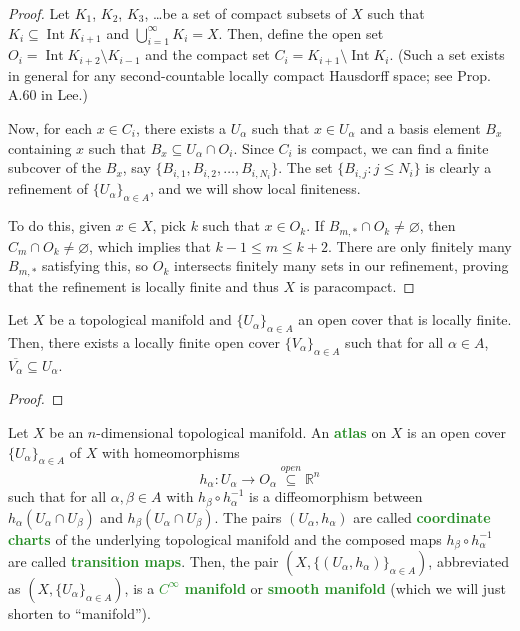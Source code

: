 \documentclass[11pt]{scrartcl}
\providecommand{\ol}{\overline}
\providecommand{\RR}{\mathbb R}
\providecommand{\inv}{^{-1}}
\providecommand{\vocab}[1]{{\textbf{\textcolor{ForestGreen}{#1}}}}
\begin{document}
\begin{proof}
    Let $K_1$, $K_2$, $K_3$, \dots be a set of compact subsets of $X$
    such that $K_i\subseteq \operatorname{Int}K_{i+1}$ and
    $\bigcup_{i=1}^\infty K_i = X$.
    Then, define the open set $O_i = \operatorname{Int}K_{i+2}\setminus K_{i-1}$
    and the compact set $C_i = K_{i+1}\setminus\operatorname{Int}K_i$.
    (Such a set exists in general for any second-countable locally compact
    Hausdorff space; see Prop. A.60 in Lee.)

    Now, for each $x\in C_i$, there exists a $U_\alpha$ such that $x\in U_\alpha$
    and a basis element $B_x$ containing $x$ such that $B_x\subseteq U_\alpha\cap O_i$.
    Since $C_i$ is compact, we can find a finite subcover of the $B_x$, say
    $\{B_{i,1}, B_{i,2}, \dots, B_{i,N_i}\}$.
    The set $\{B_{i,j} : j\le N_i\}$ is clearly a refinement of
    $\{U_\alpha\}_{\alpha\in A}$, and we will show local finiteness.

    To do this, given $x\in X$, pick $k$ such that $x\in O_k$.
    If $B_{m,*}\cap O_k\ne\varnothing$, then $C_m\cap O_k\ne\varnothing$,
    which implies that $k-1\le m\le k+2$. There are only finitely many $B_{m,*}$
    satisfying this, so $O_k$ intersects finitely many sets in our refinement,
    proving that the refinement is locally finite and thus $X$ is paracompact.
\end{proof}

\begin{prop}
    \label{prop:strongrefinement}
    Let $X$ be a topological manifold and $\{U_\alpha\}_{\alpha\in A}$
    an open cover that is locally finite.
    Then, there exists a locally finite open cover $\{V_\alpha\}_{\alpha\in A}$
    such that for all $\alpha\in A$, $\ol{V_\alpha}\subseteq U_\alpha$.
\end{prop}

\begin{proof}
\end{proof}

\begin{definition}
    \label{def:smooth-man}
    Let $X$ be an $n$-dimensional topological manifold.
    An \vocab{atlas} on $X$ is an open cover $\{U_\alpha\}_{\alpha\in A}$ of $X$
    with homeomorphisms
    \begin{equation*}
        h_\alpha\colon U_\alpha\to O_\alpha\stackrel{open}{\subseteq}\RR^n
    \end{equation*}
    such that for all $\alpha,\beta\in A$ with $h_\beta\circ h_\alpha\inv$
    is a diffeomorphism between $h_\alpha(U_\alpha\cap U_\beta)$
    and $h_\beta(U_\alpha\cap U_\beta)$. The pairs $(U_\alpha, h_\alpha)$ are called
    \vocab{coordinate charts} of the underlying topological manifold
    and the composed maps $h_\beta\circ h_\alpha\inv$ are
    called \vocab{transition maps}.
    Then, the pair $(X, \{(U_\alpha,h_\alpha)\}_{\alpha\in A})$,
    abbreviated as $(X, \{U_\alpha\}_{\alpha\in A})$, is a
    \vocab{$C^\infty$ manifold} or \vocab{smooth manifold}
    (which we will just shorten to ``manifold'').
\end{definition}
\end{document}
